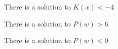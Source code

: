 \documentclass{ximera}
\begin{document}
\begin{exercise}
\begin{question}
\item {}  There is a solution to $K(x) < -4$ \\
\item {}  There is a solution to $P(w) > 6$ \\
\item {}  There is a solution to $P(w) < 0$ \\

\end{question}








\end{exercise}
\end{document}
